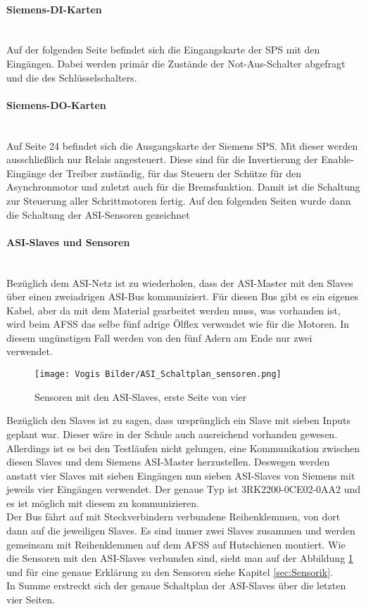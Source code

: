     \paragraph{Siemens-DI-Karten}\mbox{}\\
    Auf der folgenden Seite befindet sich die Eingangskarte der SPS mit den Eingängen. Dabei werden primär die Zustände der Not-Aus-Schalter abgefragt und die des Schlüsselschalters.
    \paragraph{Siemens-DO-Karten}\mbox{}\\
    Auf Seite 24 befindet sich die Ausgangskarte der Siemens SPS. Mit dieser werden ausschließlich nur Relais angesteuert. Diese sind für die Invertierung der Enable-Eingänge der Treiber zuständig, für das Steuern der Schütze für den Asynchronmotor und zuletzt auch für die Bremsfunktion. Damit ist die Schaltung zur Steuerung aller Schrittmotoren fertig. Auf den folgenden Seiten wurde dann die Schaltung der ASI-Sensoren gezeichnet
    \paragraph{ASI-Slaves und Sensoren}\mbox{}\\
    Bezüglich dem ASI-Netz ist zu wiederholen, dass der ASI-Master mit den Slaves über einen zweiadrigen ASI-Bus kommuniziert. Für diesen Bus gibt es ein eigenes Kabel, aber da mit dem Material gearbeitet werden muss, was vorhanden ist, wird beim AFSS das selbe fünf adrige Ölflex verwendet wie für die Motoren. In diesem ungünstigen Fall werden von den fünf Adern am Ende nur zwei verwendet.\\
    \begin{figure}[h]
        \centering
        \texttt{[image: Vogis Bilder/ASI\_Schaltplan\_sensoren.png]}
        \caption{Sensoren mit den ASI-Slaves, erste Seite von vier}
        \label{fig:ASI_Sensoren}
    \end{figure}
    Bezüglich den Slaves ist zu sagen, dass ursprünglich ein Slave mit sieben Inputs geplant war. Dieser wäre in der Schule auch ausreichend vorhanden gewesen. Allerdings ist es bei den Testläufen nicht gelungen, eine Kommunikation zwischen diesen Slaves und dem Siemens ASI-Master herzustellen. Deswegen werden anstatt vier Slaves mit sieben Eingängen nun sieben ASI-Slaves von Siemens mit jeweils vier Eingängen verwendet. Der genaue Typ ist 3RK2200-0CE02-0AA2 und es ist möglich mit diesem zu kommunizieren.\\
    Der Bus fährt auf mit Steckverbindern verbundene Reihenklemmen, von dort dann auf die jeweiligen Slaves. Es sind immer zwei Slaves zusammen und werden gemeinsam mit Reihenklemmen auf dem AFSS auf Hutschienen montiert. Wie die Sensoren mit den ASI-Slaves verbunden sind, sieht man auf der Abbildung \ref{fig:ASI_Sensoren} und für eine genaue Erklärung zu den Sensoren siehe Kapitel \ref{sec:Sensorik}.\\
    In Summe erstreckt sich der genaue Schaltplan der ASI-Slaves über die letzten vier Seiten.
